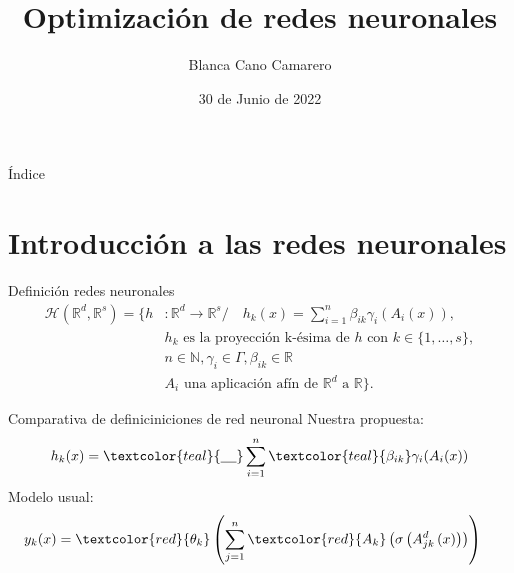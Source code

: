 \documentclass{beamer}
\title{Optimización de redes neuronales}
\author{Blanca Cano Camarero}
\date{30 de Junio de 2022}
\newcommand{\R}{\mathbb{R}}
\newcommand{\N}{\mathbb{N}}
\begin{document}
\begin{frame}
    \titlepage 
\end{frame}


\begin{frame}{Índice}
    \tableofcontents
\end{frame}
\section{Introducción a las redes neuronales}
\begin{frame}{Definición redes neuronales}
    \begin{align*}
        \mathcal{H}(\R^d,\R^s) 
            =
            \{
                h &: \R^d \longrightarrow \R^s 
                 /\quad 
                h_k(x) = 
                \sum_{i=1}^{n} \beta_{i k} \gamma_{i}( A_{i}(x)), \\
                & \text{$h_k$  es la proyección k-ésima de $h$ con 
                $k \in \{1, \ldots, s\}$}, \\
                & n \in \N,\gamma_{i} \in \Gamma , \beta_{i k} \in \R \\
                &A_{i} \text{ una aplicación afín de $\R^d$ a $\R$}           
            \}.
    \end{align*}
\end{frame}

\begin{frame}{Comparativa de definiciniciones de red neuronal}
    Nuestra propuesta: 
    \begin{align*}
                h_k(x) = 
                \textcolor{teal}{\underline{\hspace{0.4cm}}}\sum_{i=1}^{n} \textcolor{teal}{\beta_{i k}} \gamma_{i}( A_{i}(x))
    \end{align*}
    Modelo usual:
    \begin{align*}
        y_k(x) &= 
        \textcolor{red}{\theta_k}
        \left( 
            \sum^n_{j=1} \textcolor{red}{A_{k}}
            \left(
                \sigma 
                \left(
                    A^{d}_{j k}
                    \left(
                        x
                    \right)
                \right)
            \right)
        \right)
    \end{align*}
\end{frame}
\end{document}
